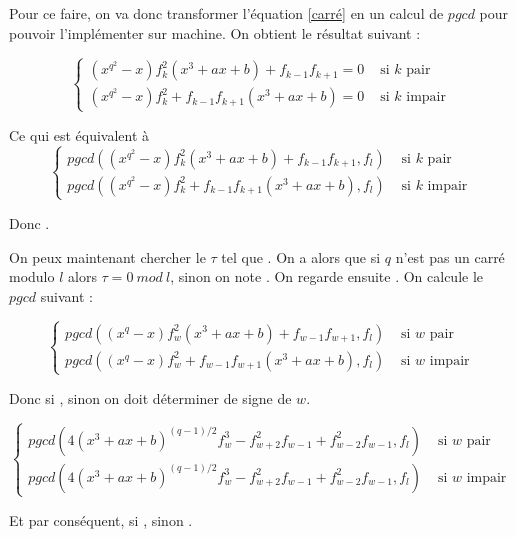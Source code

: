 \documentclass[french, lmodern]{beamer}
\begin{document}
\begin{frame}
\transwipe
Pour ce faire, on va donc transformer l'équation \eqref{carré} en un calcul de $pgcd$ pour pouvoir l'implémenter sur machine. On obtient le résultat suivant :
\pause

\begin{equation}
\begin{cases}(x^{q^{2}} - x)f_{k}^{2}(x^{3} + ax +b) + f_{k - 1}f_{k + 1}= 0&\text{ si }k\text{ pair}\\
(x^{q^{2}} - x)f_{k}^{2} + f_{k - 1}f_{k + 1}(x^{3} + ax +b)= 0&\text{ si }k\text{ impair}
\end{cases}
\end{equation}
\pause

Ce qui est équivalent à 
\begin{equation}
\begin{cases}pgcd((x^{q^{2}} - x)f_{k}^{2}(x^{3} + ax +b) + f_{k - 1}f_{k + 1},f_{l})&\text{ si }k\text{ pair}\\
pgcd((x^{q^{2}} - x)f_{k}^{2} + f_{k - 1}f_{k + 1}(x^{3} + ax +b),f_{l})&\text{ si }k\text{ impair}
\end{cases}
\end{equation}
\pause

Donc .
\end{frame}

\begin{frame}
\transwipe
On peux maintenant chercher le $\tau$ tel que .
On a alors que si $q$ n'est pas un carré modulo $l$ alors $\tau = 0\ mod\ l$, sinon on note . On regarde ensuite .
On calcule le $pgcd$ suivant : 
\pause

\begin{equation}
\begin{cases}pgcd((x^{q} - x)f_{w}^{2}(x^{3} + ax +b) + f_{w - 1}f_{w + 1},f_{l})&\text{ si }w\text{ pair}\\
pgcd((x^{q} - x)f_{w}^{2} + f_{w - 1}f_{w + 1}(x^{3} + ax +b),f_{l})&\text{ si }w\text{ impair}
\end{cases}
\end{equation}

\pause
Donc si , sinon on doit déterminer de signe de $w$. 

\pause

\begin{equation}
\begin{cases}pgcd(4(x^{3} + ax +  b)^{(q-1)/2}f_{w}^{3} - f_{w + 2}^{2}f_{w - 1} + f_{w - 2}^{2}f_{w - 1},f_{l})&\text{ si }w\text{ pair}\\
pgcd(4(x^{3} + ax +  b)^{(q-1)/2}f_{w}^{3} - f_{w + 2}^{2}f_{w - 1} + f_{w - 2}^{2}f_{w - 1},f_{l})&\text{ si }w\text{ impair}
\end{cases}
\end{equation}
\pause

Et par conséquent, si , sinon .
\end{frame}
\end{document}
